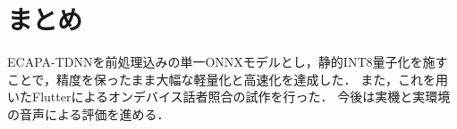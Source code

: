 \documentclass[paper=a4paper,fontsize=10.5pt]{jlreq}
\begin{document}
\section{まとめ}
ECAPA-TDNNを前処理込みの単一ONNXモデルとし，静的INT8量子化を施すことで，精度を保ったまま大幅な軽量化と高速化を達成した．
また，これを用いたFlutterによるオンデバイス話者照合の試作を行った．
今後は実機と実環境の音声による評価を進める．
\end{document}

